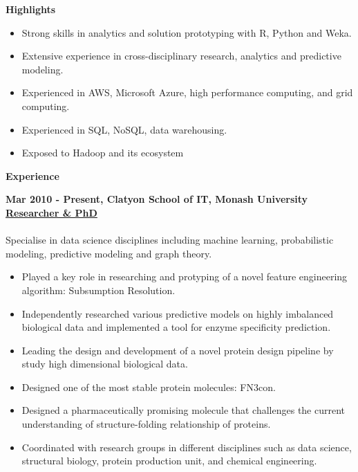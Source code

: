 \documentclass[a4paper,8pt,final]{memoir}
\newcommand{\Sep}{\vspace{1.5em}}
\newcommand{\SmallSep}{\vspace{0.5em}}
\newcommand{\CVSection}[1]
	{\Large\textbf{#1}\par
	\SmallSep\normalsize\normalfont}
\newcommand{\CVItem}[1]
	{\textbf{\color{RoyalBlue} #1}}
\begin{document}

\CVSection{Highlights}
    \begin{itemize}
        \item Strong skills in analytics and solution prototyping with R, Python and Weka.
        \item Extensive experience in cross-disciplinary research, analytics and predictive modeling.
        \item Experienced in AWS, Microsoft Azure, high performance computing, and grid computing.
        \item Experienced in SQL, NoSQL, data warehousing.
        \item Exposed to Hadoop and its ecosystem
    \end{itemize}
\Sep

\CVSection{Experience}
\CVItem{Mar 2010 - Present, Clatyon School of IT, Monash University}\\
\underline{\textbf{Researcher \& PhD}}\\
\\
Specialise in data science disciplines including machine learning, probabilistic modeling, predictive modeling and graph theory.
    \begin{itemize}
        \item Played a key role in researching and protyping of a novel feature engineering algorithm: Subsumption Resolution.
        \item Independently researched various predictive models on highly imbalanced biological data and implemented a tool for enzyme specificity prediction.
        \item Leading the design and development of a novel protein design pipeline by study high dimensional biological data.
        \item Designed one of the most stable protein molecules: FN3con.
        \item Designed a pharmaceutically promising molecule that challenges the current understanding of structure-folding relationship of proteins.
        \item Coordinated with research groups in different disciplines such as data science, structural biology, protein production unit, and chemical engineering.
    \end{itemize}
\Sep
\end{document}
